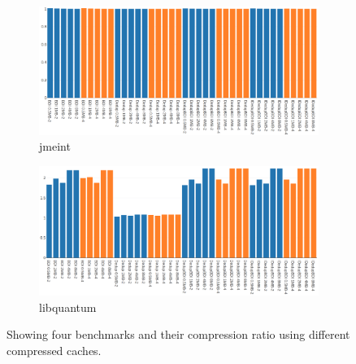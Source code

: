 \begin{figure}
    \begin{subfigure}{\textwidth}
        \includegraphics[width=\textwidth]{jmeint-compratio.png}
        \caption{jmeint}
    \end{subfigure}
    \begin{subfigure}{\textwidth}
        \includegraphics[width=\textwidth]{libquantum-compratio.png}
        \caption{libquantum}
    \end{subfigure}
    \caption[Case Study: Compression2]{Showing four benchmarks and their compression ratio using different compressed caches.}
    \label{fig:case_compratio2}
\end{figure}
